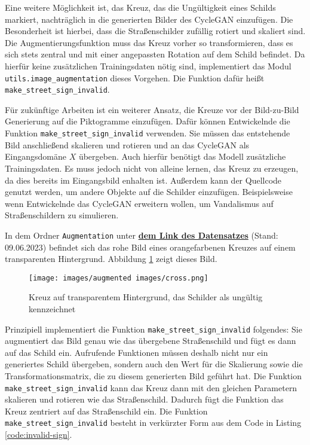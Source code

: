 Eine weitere Möglichkeit ist, das Kreuz, das die Ungültigkeit eines Schilds markiert, nachträglich in die generierten Bilder des \ac{CycleGAN} einzufügen. Die Besonderheit ist hierbei, dass die Straßenschilder zufällig rotiert und skaliert sind. Die Augmentierungsfunktion muss das Kreuz vorher so transformieren, dass es sich stets zentral und mit einer angepassten Rotation auf dem Schild befindet. Da hierfür keine zusätzlichen Trainingsdaten nötig sind, implementiert das Modul  \texttt{utils.image_augmentation} dieses Vorgehen. Die Funktion dafür heißt \texttt{make_street_sign_invalid}. 

Für zukünftige Arbeiten ist ein weiterer Ansatz, die Kreuze vor der Bild-zu-Bild Generierung auf die Piktogramme einzufügen. Dafür können Entwickelnde die Funktion \texttt{make_street_sign_invalid} verwenden. Sie müssen das entstehende Bild anschließend skalieren und rotieren und an das \ac{CycleGAN} als Eingangsdomäne $X$ übergeben. Auch hierfür benötigt das Modell zusätzliche Trainingsdaten. Es muss jedoch nicht von alleine lernen, das Kreuz zu erzeugen, da dies bereits im Eingangsbild enhalten ist. Außerdem kann der Quellcode genutzt werden, um andere Objekte auf die Schilder einzufügen. Beispielsweise wenn Entwickelnde das \ac{CycleGAN} erweitern wollen, um Vandalismus auf Straßenschildern zu simulieren.

In dem Ordner \texttt{Augmentation} unter \href{https://drive.google.com/drive/folders/11gaUErheUYb0WlBPtWhxgCK7mE0URHYI?usp=sharing}{\textbf{dem Link des Datensatzes}} (Stand: 09.06.2023) befindet sich das rohe Bild eines orangefarbenen Kreuzes auf einem transparenten Hintergrund. Abbildung \ref{fig:cross} zeigt dieses Bild.
\begin{figure}[h]
	\centering
	\texttt{[image: images/augmented images/cross.png]}
	\caption{Kreuz auf transparentem Hintergrund, das Schilder als ungültig kennzeichnet}
	\label{fig:cross}
\end{figure} 
Prinzipiell implementiert die Funktion \texttt{make_street_sign_invalid} folgendes: Sie augmentiert das Bild genau wie das übergebene Straßenschild und fügt es dann auf das Schild ein. Aufrufende Funktionen müssen deshalb nicht nur ein generiertes Schild übergeben, sondern auch den Wert für die Skalierung sowie die Transformationsmatrix, die zu diesem generierten Bild geführt hat. Die Funktion \texttt{make_street_sign_invalid} kann das Kreuz dann mit den gleichen Parametern skalieren und rotieren wie das Straßenschild. Dadurch fügt die Funktion das Kreuz zentriert auf das Straßenschild ein. Die Funktion \texttt{make_street_sign_invalid} besteht in verkürzter Form aus dem Code in Listing \ref{code:invalid-sign}.

